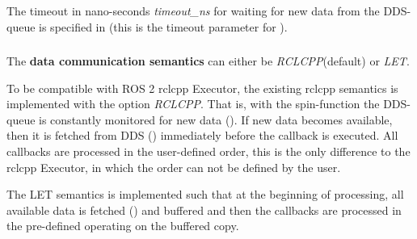 \subsubsection{}
The timeout in nano-seconds \textit{timeout\_ns} for waiting for new data from the DDS-queue is specified in  (this is the timeout parameter for ).

\subsubsection{}
The \textbf{data communication semantics} can either be \textit{RCLCPP}(default) or \textit{LET}.

To be compatible with ROS 2 rclcpp Executor, the existing rclcpp semantics is implemented with the option \textit{RCLCPP}. That is, with the spin-function the DDS-queue is constantly monitored for new data (). If new data becomes available, then it is fetched from DDS () immediately before the callback is executed. All callbacks are processed in the user-defined order, this is the only difference to the rclcpp Executor, in which the order can not be defined by the user.

The LET semantics is implemented such that at the beginning of processing, all available data is fetched () and buffered and then the callbacks are processed in the pre-defined operating on the buffered copy.

